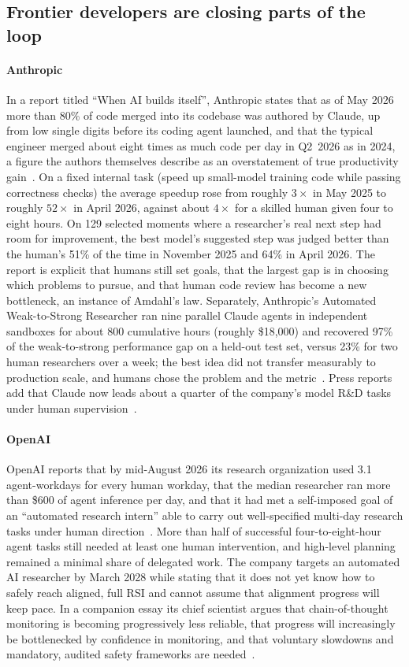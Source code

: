 \documentclass[11pt,a4paper]{article}
\begin{document}
\subsection{Frontier developers are closing parts of the loop}\label{sec:industry}
\paragraph{Anthropic} In a report titled ``When AI builds itself'', Anthropic states that as of May 2026 more than 80\% of code merged into its codebase was authored by Claude, up from low single digits before its coding agent launched, and that the typical engineer merged about eight times as much code per day in Q2~2026 as in 2024, a figure the authors themselves describe as an overstatement of true productivity gain~\cite{anthropic2026rsi}. On a fixed internal task (speed up small-model training code while passing correctness checks) the average speedup rose from roughly $3\times$ in May 2025 to roughly $52\times$ in April 2026, against about $4\times$ for a skilled human given four to eight hours. On 129 selected moments where a researcher's real next step had room for improvement, the best model's suggested step was judged better than the human's 51\% of the time in November 2025 and 64\% in April 2026. The report is explicit that humans still set goals, that the largest gap is in choosing which problems to pursue, and that human code review has become a new bottleneck, an instance of Amdahl's law. Separately, Anthropic's Automated Weak-to-Strong Researcher ran nine parallel Claude agents in independent sandboxes for about 800 cumulative hours (roughly \$18{,}000) and recovered 97\% of the weak-to-strong performance gap on a held-out test set, versus 23\% for two human researchers over a week; the best idea did not transfer measurably to production scale, and humans chose the problem and the metric~\cite{wen2026aar}. Press reports add that Claude now leads about a quarter of the company's model R\&D tasks under human supervision~\cite{ap2026rsi}.

\paragraph{OpenAI} OpenAI reports that by mid-August 2026 its research organization used 3.1 agent-workdays for every human workday, that the median researcher ran more than \$600 of agent inference per day, and that it had met a self-imposed goal of an ``automated research intern'' able to carry out well-specified multi-day research tasks under human direction~\cite{openai2026accel}. More than half of successful four-to-eight-hour agent tasks still needed at least one human intervention, and high-level planning remained a minimal share of delegated work. The company targets an automated AI researcher by March 2028 while stating that it does not yet know how to safely reach aligned, full RSI and cannot assume that alignment progress will keep pace. In a companion essay its chief scientist argues that chain-of-thought monitoring is becoming progressively less reliable, that progress will increasingly be bottlenecked by confidence in monitoring, and that voluntary slowdowns and mandatory, audited safety frameworks are needed~\cite{pachocki2026alien}.
\end{document}
